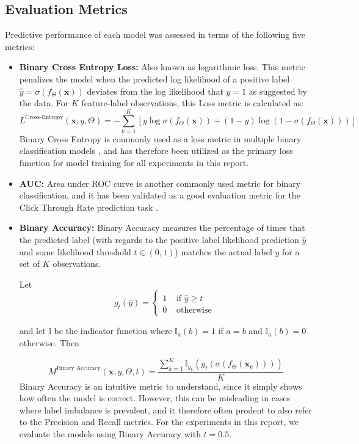 \documentclass{mldsmsc}
\begin{document}
\subsection{Evaluation Metrics}
\label{sec:evaluation-metrics}

Predictive performance of each model was assessed in terms of the following five metrics:

\begin{itemize}
    \item \textbf{Binary Cross Entropy Loss:} Also known as logarithmic loss. This metric
    penalizes the model when the predicted log likelihood of a positive label $\hat{y} = \sigma(f_{\Theta}(\mathbf{x}))$ deviates from the
    log likelihood that $y=1$ as suggested by the data. For $K$ feature-label observations, this Loss metric is calculated as:
    \[
    L^{\text{Cross-Entropy}}(\mathbf{x},y,\Theta) = - \sum_{k=1}^{K} \left[y \log \sigma(f_{\Theta}(\mathbf{x})) + (1-y)\log \left( 1 - \sigma(f_{\Theta}(\mathbf{x}))\right) \right]
    \]
    Binary Cross Entropy is commonly used as a loss metric in multiple binary classification models
    \citep{RefWorks:zhang2021deep}, and has therefore been utilized as the primary loss function
    for model training for all experiments in this report.

    \item \textbf{AUC:} Area under ROC curve is another commonly used metric for binary classification,
    and it has been validated as a good evaluation metric for the Click Through Rate prediction task
    \citep{RefWorks:graepel2010web-scale}.

    \item \textbf{Binary Accuracy:} Binary Accuracy measures the percentage of times that the predicted label
    (with regards to the positive label likelihood prediction $\hat{y}$ and some likelihood threshold $t \in (0,1)$)
    matches the actual label $y$ for a set of $K$ observations.

    Let
    \[
    g_{t}(\hat{y}) =
    \begin{cases}
        1 & \text{ if } \hat{y} \geq t \\
        0 & \text{ otherwise }
    \end{cases}
    \]

    and let $\mathbb{I}$ be the indicator function where $\mathbb{I}_{a}(b)=1$ if $a=b$ and $\mathbb{I}_{a}(b)=0$ otherwise. Then

    \[
    M^{\text{Binary Accuracy}}(\mathbf{x},y,\Theta,t) = \frac{ \sum_{k=1}^{K} \mathbb{I}_{y_k}(g_{t}(\sigma(f_{\Theta}(\mathbf{x}_k))))}{K}
    \]
    Binary Accuracy is an intuitive metric to understand, since it simply shows how often the model is correct.
    However, this can be misleading in cases where label imbalance is prevalent, and it therefore often prodent
    to also refer to the Precision and Recall metrics. For the experiments in this report,
    we evaluate the models using Binary Accuracy with $t=0.5$.


\end{itemize}
\end{document}
